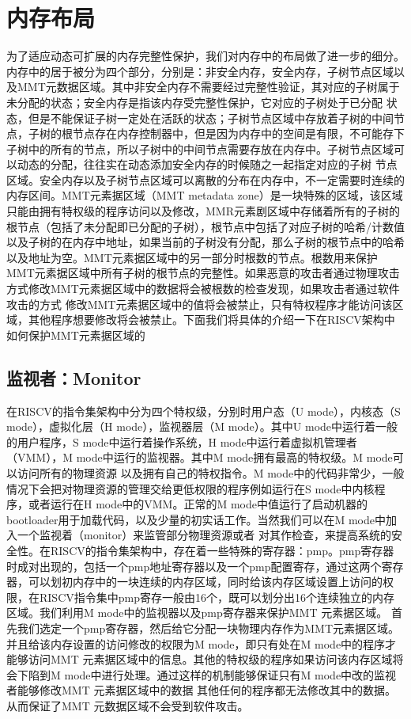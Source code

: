 \section{内存布局}
为了适应动态可扩展的内存完整性保护，我们对内存中的布局做了进一步的细分。内存中的居于被分为四个部分，分别是：非安全内存，安全内存，子树节点区域以及MMT元数据区域。其中非安全内存不需要经过完整性验证，其对应的子树属于未分配的状态；安全内存是指该内存受完整性保护，它对应的子树处于已分配
状态，但是不能保证子树一定处在活跃的状态；子树节点区域中存放着子树的中间节点，子树的根节点存在内存控制器中，但是因为内存中的空间是有限，不可能存下子树中的所有的节点，所以子树中的中间节点需要存放在内存中。子树节点区域可以动态的分配，往往实在动态添加安全内存的时候随之一起指定对应的子树
节点区域。安全内存以及子树节点区域可以离散的分布在内存中，不一定需要时连续的内存区间。MMT元素据区域（MMT metadata zone）是一块特殊的区域，该区域只能由拥有特权级的程序访问以及修改，MMR元素剧区域中存储着所有的子树的根节点（包括了未分配即已分配的子树），根节点中包括了对应子树的哈希/计数值
以及子树的在内存中地址，如果当前的子树没有分配，那么子树的根节点中的哈希以及地址为空。MMT元素据区域中的另一部分时根数的节点。根数用来保护MMT元素据区域中所有子树的根节点的完整性。如果恶意的攻击者通过物理攻击方式修改MMT元素据区域中的数据将会被根数的检查发现，如果攻击者通过软件攻击的方式
修改MMT元素据区域中的值将会被禁止，只有特权程序才能访问该区域，其他程序想要修改将会被禁止。下面我们将具体的介绍一下在RISCV架构中如何保护MMT元素据区域的

\subsection{监视者：Monitor}
在RISCV的指令集架构中分为四个特权级，分别时用户态（U mode），内核态（S mode），虚拟化层（H mode），监视器层（M mode）。其中U mode中运行着一般的用户程序，S mode中运行着操作系统，H mode中运行着虚拟机管理者（VMM），M mode中运行的监视器。其中M mode拥有最高的特权级。M mode可以访问所有的物理资源
以及拥有自己的特权指令。M mode中的代码非常少，一般情况下会把对物理资源的管理交给更低权限的程序例如运行在S mode中内核程序，或者运行在H mode中的VMM。正常的M mode中值运行了启动机器的bootloader用于加载代码，以及少量的初实话工作。当然我们可以在M mode中加入一个监视着（monitor）来监管部分物理资源或者
对其作检查，来提高系统的安全性。在RISCV的指令集架构中，存在着一些特殊的寄存器：pmp。pmp寄存器时成对出现的，包括一个pmp地址寄存器以及一个pmp配置寄存，通过这两个寄存器，可以划初内存中的一块连续的内存区域，同时给该内存区域设置上访问的权限，在RISCV指令集中pmp寄存一般由16个，既可以划分出16个连续独立的内存区域。我们利用M mode中的监视器以及pmp寄存器来保护MMT 元素据区域。
首先我们选定一个pmp寄存器，然后给它分配一块物理内存作为MMT元素据区域。并且给该内存设置的访问修改的权限为M mode，即只有处在M mode中的程序才能够访问MMT 元素据区域中的信息。其他的特权级的程序如果访问该内存区域将会下陷到M mode中进行处理。通过这样的机制能够保证只有M mode中改的监视者能够修改MMT 元素据区域中的数据
其他任何的程序都无法修改其中的数据。从而保证了MMT 元数据区域不会受到软件攻击。

